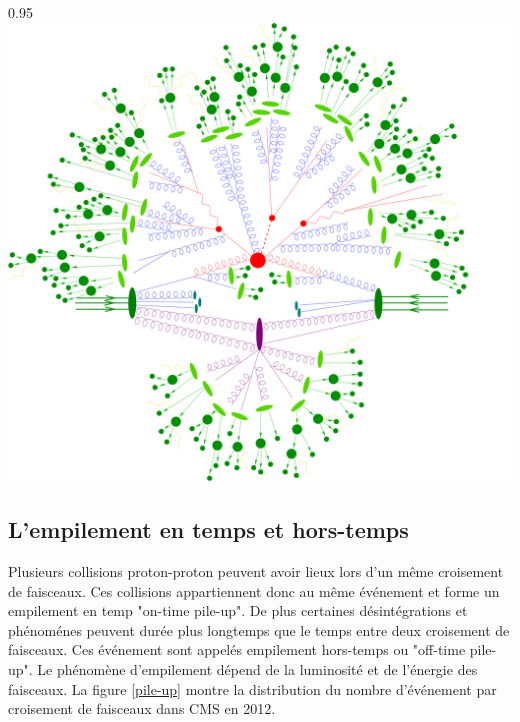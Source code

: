 \begin{minipagewithmarginpars}[h]{0.95\textwidth}
	\centering
	\includegraphics[width=1.0\textwidth]{LHC/event.jpg}
	\label{collision2}	
\end{minipagewithmarginpars}

\subsection{L'empilement en temps et hors-temps}
Plusieurs collisions proton-proton peuvent avoir lieux lors d'un même croisement de faisceaux. Ces collisions appartiennent donc au même événement et forme un empilement en temp "on-time pile-up". De plus certaines désintégrations et phénoménes peuvent durée plus longtemps que le temps entre deux croisement de faisceaux. Ces événement sont appelés empilement hors-temps ou "off-time pile-up". Le phénomène d'empilement dépend de la luminosité et de l'énergie des faisceaux. La figure \ref{pile-up} montre la distribution du nombre d'événement par croisement de faisceaux dans CMS en 2012.

